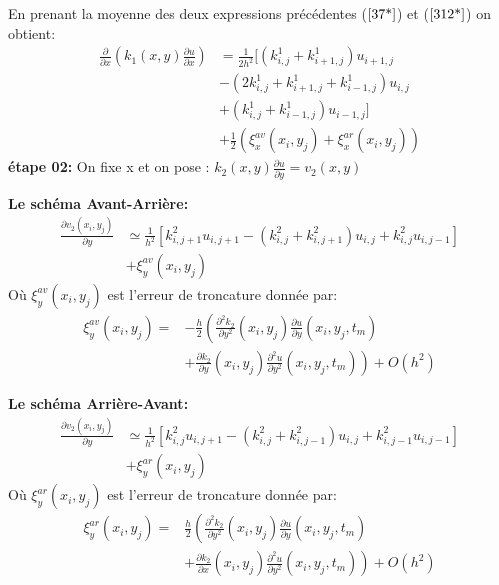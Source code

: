 \documentclass[12pt]{beamer}
\begin{document}
  \begin{frame}
  	En prenant la moyenne des deux expressions pr\'{e}c\'{e}dentes ($\ref{37*}$) et ($\ref{312*}$) on obtient:
  \begin{align}
  \frac{\partial}{\partial{x}}(k_{1}(x,y)\frac{\partial{u}}{\partial{x}})\nonumber&=\frac{1}{2h^{2}}[ (k^{1}_{i,j}+k^{1}_{i+1,j})u_{i+1,j}\nonumber\\&-(2k^{1}_{i,j}+k^{1}_{i+1,j}+k^{1}_{i-1,j})u_{i,j}\nonumber\\&+(k^{1}_{i,j}+k^{1}_{i-1,j})u_{i-1,j}] \nonumber\\&+\frac{1}{2}(\xi^{av}_{x}(x_{i},y_{j})+\xi^{ar}_{x}(x_{i},y_{j}))\end{align}
  \textbf{\'{e}tape 02:} On fixe x et on pose :	$k_{2}(x,y)\frac{\partial{u}}{\partial{y}}=v_{2}(x,y)$\\
\end{frame}
 	 \begin{frame}
 	\begin{block}{}
\textbf{\large{Le sch\'{e}ma Avant-Arri\`{e}re:}}
\begin{align} \frac{\partial{v}_{2}(x_{i},y_{j})}{\partial{y}}&\simeq \frac{1}{h^{2}}[k^{2}_{i,j+1}u_{i,j+1}-(k^{2}_{i,j}+k^{2}_{i,j+1})u_{i,j}+k^{2}_{i,j}u_{i,j-1}]\nonumber\\&+\xi^{av}_{y}(x_{i},y_{j}) \label{318*}\end{align}
O\`{u}  $\xi^{av}_{y}(x_{i},y_{j})$ est l'erreur de troncature donn\'{e}e par:\\
\begin{align}
\xi^{av}_{y}(x_{i},y_{j})=&-\frac{h}{2}\left( \frac{\partial^{2}{k}_{2}}{\partial{y^{2}}}(x_{i},y_{j})\frac{\partial{u}}{\partial{y}}(x_{i},y_{j},t_{m})\right. \nonumber\\&+\left. \frac{\partial{k_{2}}}{\partial{y}}(x_{i},y_{j})\frac{\partial^{2}{u}}{\partial{y^{2}}}(x_{i},y_{j},t_{m})\right) +O(h^{2}) \end{align}
\end{block}
\end{frame}
\begin{frame}
\begin{block}{}
\textbf{\large{Le sch\'{e}ma Arri\`{e}re-Avant:}}
\begin{align}  \frac{\partial{v}_{2}(x_{i},y_{j})}{\partial{y}}&\simeq \frac{1}{h^{2}}[k^{2}_{i,j}u_{i,j+1}-(k^{2}_{i,j}+k^{2}_{i,j-1})u_{i,j}+k^{2}_{i,j-1}u_{i,j-1}]\nonumber\\&+\xi^{ar}_{y}(x_{i},y_{j})\label{323*} \end{align}
O\`{u}  $\xi^{ar}_{y}(x_{i},y_{j})$ est l'erreur de troncature donn\'{e}e par:
\begin{align}
\xi^{ar}_{y}(x_{i},y_{j})=&\frac{h}{2}\left( \frac{\partial^{2}{k}_{2}}{\partial{y^{2}}}(x_{i},y_{j})\frac{\partial{u}}{\partial{y}}(x_{i},y_{j},t_{m})\right. \nonumber\\&+\left. \frac{\partial{k_{2}}}{\partial{x}}(x_{i},y_{j})\frac{\partial^{2}{u}}{\partial{y^{2}}}(x_{i},y_{j},t_{m})\right) +O(h^{2}) 
\end{align}
\end{block}
  \end{frame}
\end{document}
